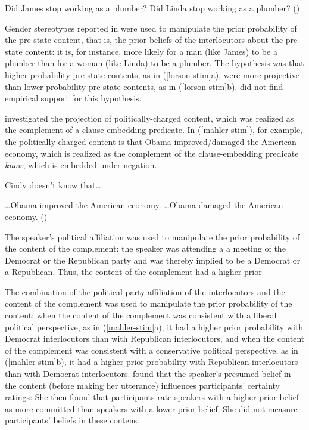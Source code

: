 \documentclass[11pt,fleqn]{article}
\newcommand{\6}{\mbox{$[\hspace*{-.6mm}[$}}
\newcommand{\9}{\mbox{$]\hspace*{-.6mm}]$}}
\begin{document}
\begin{exe}
\ex\label{lorson-stim} 
\begin{xlist}
\ex Did James stop working as a plumber?
\ex Did Linda stop working as a plumber? \hfill (\citealt[38]{lorson2018})
\end{xlist}
\end{exe}
Gender stereotypes reported in \citealt*{boyce-etal2018} were used to manipulate the prior probability of the pre-state content, that is, the prior beliefs of the interlocutors about the pre-state content: it is, for instance, more likely for a man (like James) to be a plumber than for a woman (like Linda) to be a plumber. The hypothesis was that higher probability pre-state contents, as in (\ref{lorson-stim}a), were more projective than lower probability pre-state contents, as in (\ref{lorson-stim}b). \citet{lorson2018} did not find empirical support for this hypothesis.

\citet{mahler2020} investigated the projection of politically-charged content, which was realized as the complement of a clause-embedding predicate. In (\ref{mahler-stim}), for example, the politically-charged content is that Obama improved/damaged the American economy, which is realized as the complement of the clause-embedding predicate {\em know}, which is embedded under negation. 

\begin{exe}
\ex\label{mahler-stim} Cindy doesn't know that\ldots
\begin{xlist}
\ex \ldots Obama improved the American economy.
\ex \ldots Obama damaged the American economy. \hfill (\citealt[779]{mahler2020})
\end{xlist}
\end{exe}
The speaker's political affiliation was used to manipulate the prior probability of the content of the complement: the speaker was attending a a meeting of the Democrat or the Republican party and was thereby implied to be a Democrat or a Republican. Thus, the content of the complement had a higher prior 

The combination of the political party affiliation of the interlocutors and the content of the complement was used to manipulate the prior probability of the content: when the content of the complement was consistent with a liberal political perspective, as in (\ref{mahler-stim}a), it had a higher prior probability with Democrat interlocutors than with Republican interlocutors, and when the content of the complement was consistent with a conservative political perspective, as in (\ref{mahler-stim}b), it had a higher prior probability with Republican interlocutors than with Democrat interlocutors. \citet{mahler2020} found that the speaker's presumed belief in the content (before making her utterance) influences participants' certainty ratings: She then found that participants rate speakers with a higher prior belief as more committed than speakers with a lower prior belief. She did not measure participants' beliefs in these contens.
\end{document}
